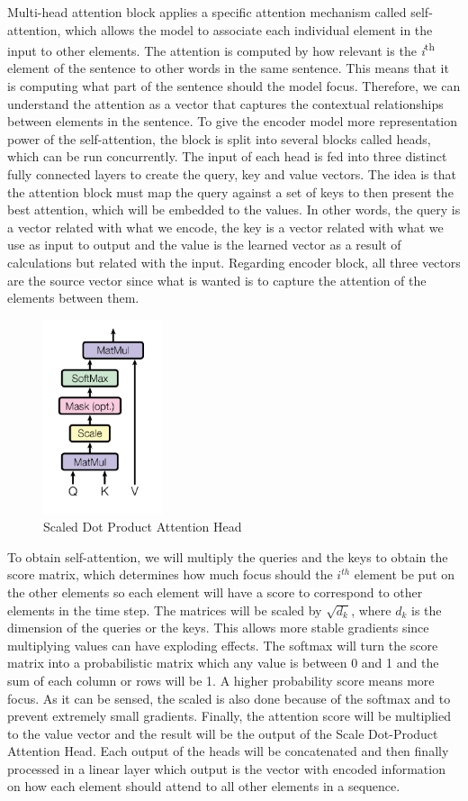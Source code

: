 \documentclass[11pt, a4paper]{article}
\begin{document}
	Multi-head attention block applies a specific attention mechanism called self-attention, which allows the model to associate each individual element in the input to other elements. The attention is computed by how relevant is the \textit{i}\textsuperscript{th} element of the sentence to other words in the same sentence. This means that it is computing what part of the sentence should the model focus. Therefore, we can understand the attention as a vector that captures the contextual relationships between elements in the sentence.  To give the encoder model more representation power of the self-attention, the block is split into several blocks called heads, which can be run concurrently. The input of each head is fed into three distinct fully connected layers to create the query, key and value vectors. The idea is that the attention block must map the query against a set of keys to then present the best attention, which will be embedded to the values. In other words, the query is a vector related with what we encode, the key is a vector related with what we use as input to output and the value is the learned vector as a result of calculations but related with the input. Regarding encoder block, all three vectors are the source vector since what is wanted is to capture the attention of the elements between them.
	\begin{figure}[H]
		\centering
		\includegraphics[width=3.5cm]{imgs/relatedwork/transformer-scale-dot-product-attention}
		\caption{Scaled Dot Product Attention Head}
		\label{fig:related-transformer-head}
	\end{figure}
	To obtain self-attention, we will multiply the queries and the keys to obtain the score matrix, which determines how much focus should the $i^{th}$ element be put on the other elements so each element will have a score to correspond to other elements in the time step. The matrices will be scaled by $\sqrt{d_k}$, where $d_k$ is the dimension of the queries or the keys. This allows more stable gradients since multiplying values can have exploding effects. The softmax will turn the score matrix into a probabilistic matrix which any value is between 0 and 1 and the sum of each column or rows will be 1. A higher probability score means more focus. As it can be sensed, the scaled is also done because of the softmax and to prevent extremely small gradients. Finally, the attention score will be multiplied to the value vector and the result will be the output of the Scale Dot-Product Attention Head. Each output of the heads will be concatenated and then finally processed in a linear layer which output is the vector with encoded information on how each element should attend to all other elements in a sequence.
\end{document}
